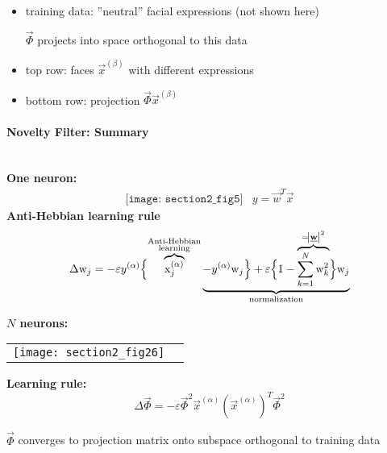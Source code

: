 	\vspace{-0.5cm}
	\begin{itemize}
		\item training data: ''neutral'' facial expressions (not shown here)
		\begin{itemize}
			\itl $\vec{\Phi}$ projects into space orthogonal to this data
		\end{itemize}
		\item top row: faces $\vec{x}^{(\beta)}$ with different expressions
		\item bottom row: projection $\vec{\Phi} \vec{x}^{(\beta)}$
	\end{itemize}

\paragraph{Novelty Filter: Summary}\mbox{}\\
	\textbf{One neuron:}
	\[ \begin{array}{ll}
	\texttt{[image: section2\_fig5]}
	& y = \vec{w}^T \vec{x}
	\end{array} \]
	\textbf{Anti-Hebbian learning rule}
		\begin{equation*}
			\Delta \mathrm{w}_j = - \varepsilon y^{(\alpha)} \Bigl\{ \overbrace{\mathrm{x}_j^{(\alpha)}}^{\substack{\text{Anti-Hebbian} \\ \text{learning}}} \underbrace{ - y^{(\alpha)} \mathrm{w}_j \Bigr\} + \varepsilon \Bigl\{ 1- \overbrace{\sum_{k=1}^{N} \mathrm{w}_k^2}^{=\abs{\underline{\mathbf{w}}}^2} \Bigr\} \mathrm{w}_j}_{\text{normalization}}
		\end{equation*}
		
\textbf{$N$ neurons:}\\
	\begin{center}
	 \begin{tabular}{ll}
		\texttt{[image: section2\_fig26]}
		& \raisebox{1cm}{$\tilde{\vec{y}}^{(\alpha)} = \vec{\Phi} \vec{x}^{(\alpha)}$}
	\end{tabular} 
	\end{center}
	\textbf{Learning rule:}
		\begin{equation*}
			\Delta \vec{\Phi} = - \varepsilon \vec{\Phi}^2 \vec{x}^{(\alpha)} \left( \vec{x}^{(\alpha)} \right)^T \vec{\Phi}^2
		\end{equation*}
		\vspace{-0.5cm}
		\begin{itemize}
			\itl $\vec{\Phi}$ converges to projection matrix onto subspace orthogonal to training data
		\end{itemize}
		
